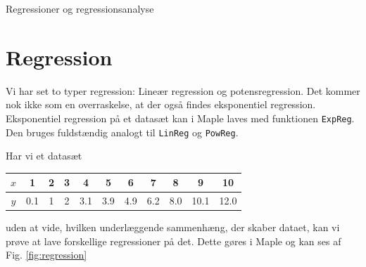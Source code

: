 \begin{center}
\Huge
Regressioner og regressionsanalyse
\end{center}
\section*{Regression}
Vi har set to typer regression: Lineær regression og potensregression. Det kommer nok ikke som en overraskelse, at der også findes eksponentiel regression. Eksponentiel regression på et datasæt kan i Maple laves med funktionen \texttt{ExpReg}. Den bruges fuldstændig analogt til \texttt{LinReg} og \texttt{PowReg}.

\begin{exa}
Har vi et datasæt 
\begin{center}
\begin{tabular}{c|c|c|c|c|c|c|c|c|c|c}
$x$ & 1 & 2 & 3 & 4 & 5 & 6 & 7 & 8 & 9 & 10 \\ \hline
$y$ & 0.1 & 1 & 2 & 3.1 & 3.9 & 4.9 & 6.2 & 8.0 & 10.1 & 12.0
\end{tabular}
\end{center}
uden at vide, hvilken underlæggende sammenhæng, der skaber dataet, kan vi prøve at lave forskellige regressioner på det. Dette gøres i Maple og kan ses af Fig. \ref{fig:regression}


\end{exa}
